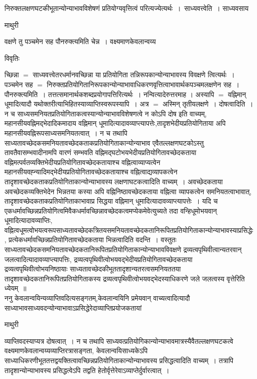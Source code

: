 \documentclass[10pt, openany]{book}
\begin{document}
{निरुक्तलक्षणघटकीभूतान्योन्याभावविशेषणं प्रतियोग्यवृत्तित्वं परित्यज्येत्यर्थः~।~{\la साध्यवत्त्वेति~।} साध्यवसाय
\newpage
 \begin{center}  माथुरी  \end{center}
{\la वक्षणे तु पञ्चमेन सह पौनरुक्त्यमिति चेन्न~। वक्ष्यमाणकेवलान्वय्य\textendash}
\begin{center}     विवृतिः \end{center}
च्छिन्ना $=$ साध्यवत्त्वेतरधर्मानवच्छिन्ना या प्रतियोगिता तन्निरूपकान्योन्याभावस्य विवक्षणे त्वित्यर्थः~। पञ्चमेन सह $=$ निरुक्तप्रतियोगितानिरूपकान्योन्याभावाधिकरणवृत्तित्वाभावार्थकपञ्चमलक्षणेन सह~। {\qt पौनरुक्त्यमिति~}। तत्तत्समानार्थकशब्दप्रयोगापत्तिरित्यर्थः~।  नन्वित्यादेरुत्तरमाह । अस्यापि $=$ वह्निमान् धूमादित्यादौ यथोक्तरीत्याभिहितस्याव्याप्तिस्वरूपस्यापि~। अत्र $=$ अस्मिन् तृतीयलक्षणे~।
{\la दोषत्वादिति~।} न च साध्यसमनियतप्रतियोगिताकत्वस्यान्योन्याभावविशेषणत्वे न कोऽपि दोष इति वाच्यम्, महानसीयवह्निमद्भेदादिकमादाय वह्निमान्
धूमादित्यादावव्याप्त्यापत्तेः,तादृशभेदीयप्रतियोगिताया अपि महानसीयवह्निरूपसाध्यसमनियतत्वात्~। न च तथापि साध्यतावच्छेदकसमनियतावच्छेदकताकप्रतियोगिताकान्योन्याभाव एवैतल्लक्षणघटकोऽस्तु तावतैवासम्भवादीनामपि वारणं सम्भवति वह्निमद्घटोभयभेदीयप्रतियोगितावच्छेदकताया वह्निमत्पर्वतव्यक्तिभेदीयप्रतियोगितावच्छेदकतायाश्च वह्नित्वाव्याप्यत्वेन महानसीयवह्न्यादिमद्भेदीयप्रतियोगितावच्छेदकतायाश्च वह्नित्वाद्यव्यापकत्वेन तादृशावच्छेदकताकप्रतियोगिताकान्योन्याभावस्य लक्षणाघटकत्वादिति वाच्यम्~। अवच्छेदकताया अवच्छेदकव्यक्तिभेदेन भिन्नतया कस्या अपि वह्निनिष्ठावच्छेदकताया वह्नित्वा व्यापकत्वेन समनियतत्वाभावात्, तादृशावच्छेदकताकप्रतियोगिताकाभावाप्र सिद्धया वह्निमान् धूमादित्यादावव्याप्त्यापत्तेः~। यदि
च एकधर्मावच्छिन्नप्रतियोगित्वमिवैकधर्मावच्छिन्नावच्छेदकत्वमप्येकमेवेत्युच्यते तदा वन्हिधूमोभयवान् धूमादित्यादावव्याप्तिः,
वह्नित्वधूमत्वोभयत्वरूपसाध्यतावच्छेदकत्रितयसमनियतावच्छेदकतानिरूपितप्रतियोगिताकान्योन्याभावस्याप्रसिद्धेः, प्रत्येकधर्मावच्छिन्नप्रतियोगितावच्छेदकताया भिन्नत्वादिति वदन्ति~। वस्तुतः साध्यतावच्छेदकसमनियतावच्छेदकतानिरूपितप्रतियोगिताकान्योन्याभावविवक्षणे द्रव्यत्वपृथिवीत्वान्यतरवान्  जलत्वादित्यादावव्याप्त्यापत्तिः,
द्रव्यत्वपृथिवीत्वोभयवद्भेदीयप्रतियोगितावच्छेदकताया द्रव्यत्वपृथिवीत्वोभयनिष्ठायाः साध्यतावच्छेदकीभूततादृशान्यतरत्वसमनियततया तादृशावच्छेदकतानिरूपितप्रतियोगिताकस्य द्रव्यत्वपृथिवीत्वोभयवद्भेदस्याधिकरणे जले जलत्वस्य वृत्तेरिति ध्येयम्~॥\\

ननु केवलान्वयिन्यव्याप्तिवदित्यसङ्गतम्,केवलान्वयिनि प्रमेयवान् वाच्यत्वादित्यादौ साध्याभावसाध्यवदन्योन्याभावाऽप्रसिद्धेरेदाव्याप्तिप्रयोजकतायां
\newpage
 \begin{center}  माथुरी  \end{center} 
{\la व्याप्तिवदस्याप्यत्र दोषत्वात्~। न च तथापि साध्यवत्प्रतियोगिकान्योन्याभावमात्रस्यैवैतल्लक्षणघटकत्वे वक्ष्यमाणकेवलान्वय्यव्याप्तिरत्रासङ्गता, केवलान्वयिसाध्यकेऽपि साध्याधिकरणीभूततत्तद्वयक्तित्वावच्छिन्नप्रतियोगिताकान्योन्याभावस्य प्रसिद्धत्वादिति वाच्यम्~। तत्रापि तादृशान्योन्याभावस्य प्रसिद्धत्वेऽपि तद्वति हेतोर्वृत्तेरेवाऽव्याप्तेर्दुर्वारत्वात्~।~\\

}}
\end{document}
